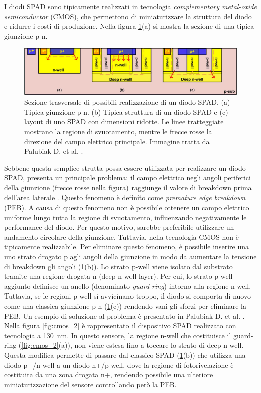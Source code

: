 I diodi SPAD sono tipicamente realizzati in tecnologia \textit{complementary metal-oxide semiconductor} (CMOS), che permettono di miniaturizzare la struttura del diodo e ridurre i costi di produzione. Nella figura \ref{fig:cmos}(a) si mostra la sezione di una tipica giunzione p-n.
\begin{figure}[tbh]
	\centering
	\includegraphics[width=0.8\linewidth]{./ImageFiles/cmos.jpg}
	\caption{Sezione trasversale di possibili realizzazione di un diodo SPAD. (a) Tipica giunzione p-n. (b) Tipica struttura di un diodo SPAD e (c) layout di uno SPAD con dimensioni ridotte. Le linee tratteggiate mostrano la regione di svuotamento, mentre le frecce rosse la direzione del campo elettrico principale. Immagine tratta da Palubiak D. et al. \cite{Palubiak2011}.}
	\label{fig:cmos}
\end{figure} 
Sebbene questa semplice strutta possa essere utilizzata per realizzare un diodo SPAD, presenta un principale problema: il campo elettrico negli angoli periferici della giunzione (frecce rosse nella figura) raggiunge il valore di breakdown prima dell'area laterale \cite{Palubiak2011}. Questo fenomeno è definito come \textit{premature edge breakdown} (PEB). A causa di questo fenomeno non è possibile ottenere un campo elettrico uniforme lungo tutta la regione di svuotamento, influenzando negativamente le performance del diodo. Per questo motivo, sarebbe preferibile utilizzare un andamento circolare della giunzione. Tuttavia, nella tecnologia CMOS non è tipicamente realizzabile. Per eliminare questo fenomeno, è possibile inserire una uno strato drogato p agli angoli della giunzione in modo da aumentare la tensione di breakdown gli angoli (\Fig\ref{fig:cmos}(b)). Lo strato p-well viene isolato dal substrato tramite una regione drogata n (deep n-well layer). Per cui, lo strato p-well aggiunto definisce un anello (denominato \textit{guard ring}) intorno alla regione n-well. Tuttavia, se le regioni p-well si avvicinano troppo, il diodo si comporta di nuovo come una classica giunzione p-n (\Fig\ref{fig:cmos}(c)) rendendo vani gli sforzi per eliminare la PEB. Un esempio di soluzione al problema è presentato in Palubiak D. et al. \cite{Palubiak2011}. Nella figura \ref{fig:cmos_2} è rappresentato il dispositivo SPAD realizzato con tecnologia a \SI{130}{\nano\meter}. In questo sensore, la regione n-well che costituisce il guard-ring (\Fig\ref{fig:cmos_2}(a)), non viene estesa fino a toccare lo strato di deep n-well. Questa modifica permette di passare dal classico SPAD (\Fig\ref{fig:cmos}(b)) che utilizza una diodo p+/n-well a un diodo n+/p-well, dove la regione di fotorivelazione è costituita da una zona drogata n+, rendendo possibile una ulteriore miniaturizzazione del sensore controllando però la PEB.
